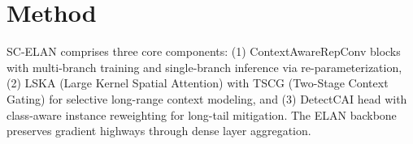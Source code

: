 \section{Method}
SC-ELAN comprises three core components: (1) ContextAwareRepConv blocks with multi-branch training and single-branch inference via re-parameterization, (2) LSKA (Large Kernel Spatial Attention) with TSCG (Two-Stage Context Gating) for selective long-range context modeling, and (3) DetectCAI head with class-aware instance reweighting for long-tail mitigation. The ELAN backbone preserves gradient highways through dense layer aggregation.
